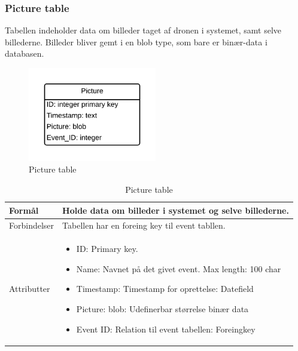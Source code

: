 \subsubsection*{Picture table}
Tabellen indeholder data om billeder taget af dronen i systemet, samt selve billederne. Billeder bliver gemt i en blob type, som bare er binær-data i databasen.
\vspace{-5pt}
\begin{figure}[H]
	\centering
	\includegraphics[width=0.5\textwidth]{Billeder/database/PictureTable.png}
	\vspace{-5pt}
	\caption{Picture table}
	\label{fig:picture_table}
\end{figure}

\begin{table}[H]
\begin{tabular}{| p{3cm}| p{11.5cm}|}
\hline

Formål	 							& Holde data om billeder i systemet og selve billederne.\\\hline
Forbindelser						& Tabellen har en foreing key til event tabllen.\\\hline
Attributter						& \begin{itemize}
												\item ID: Primary key.
												\item Name: Navnet på det givet event. Max length: 100 char
												\item Timestamp: Timestamp for oprettelse: Datefield
												\item Picture: blob: Udefinerbar størrelse binær data
												\item Event ID: Relation til event tabellen: Foreingkey
											\end{itemize} \\\hline 
\end{tabular}
\caption{Picture table}
\label{tab:picture_table}
\end{table}